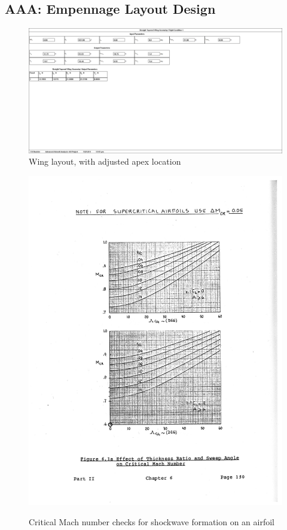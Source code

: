 \documentclass[conf]{new-aiaa}
\begin{document}
\subsection{AAA: Empennage Layout Design}

\begin{figure}[H]
    \includegraphics[width=\textwidth]{Report3Printouts/changedwing.png}
    \caption{Wing layout, with adjusted apex location}
    \label{fig:changedwing}
\end{figure}

\begin{figure}[H]
    \includegraphics[width=\textwidth]{plots/Mcr_check.png}
    \label{fig:critical_mach_check}
    \caption{Critical Mach number checks for shockwave formation on an airfoil}
\end{figure}
\end{document}
